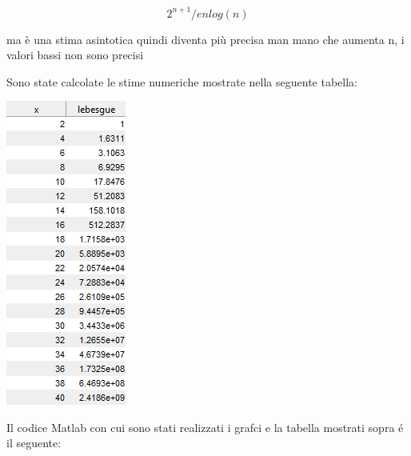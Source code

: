 \[
2^{n+1} / e n log(n)
\]

ma è una stima asintotica quindi diventa più precisa man mano che aumenta n, i valori bassi non sono precisi

\noindent Sono state calcolate le stime numeriche mostrate nella seguente tabella:

\begin{center}
	\includegraphics[scale=0.7]{cap4/4_9/4_9.png}
\end{center}

\noindent Il codice Matlab con cui sono stati realizzati i grafci e la tabella mostrati sopra \'e il seguente: \\


